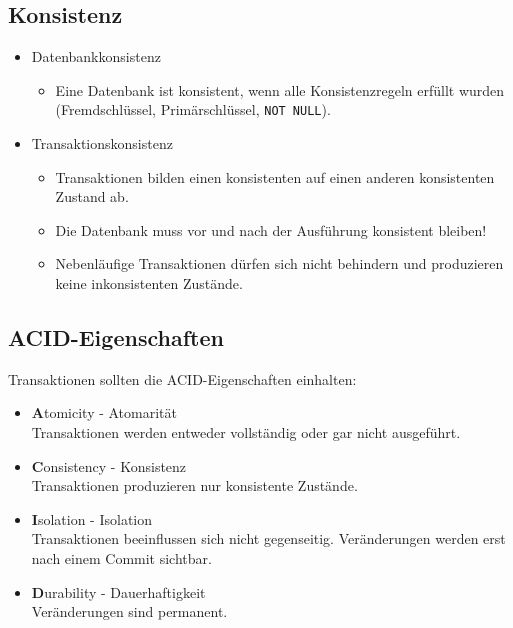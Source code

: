         \subsection{Konsistenz} %
            \begin{itemize}
            	\item Datenbankkonsistenz
            		\begin{itemize}
            			\item Eine Datenbank ist konsistent, wenn alle Konsistenzregeln erfüllt wurden (Fremdschlüssel, Primärschlüssel, \lstinline|NOT NULL|).
            		\end{itemize}
            	\item Transaktionskonsistenz
            		\begin{itemize}
            			\item Transaktionen bilden einen konsistenten auf einen anderen konsistenten Zustand ab.
            			\item Die Datenbank muss vor und nach der Ausführung konsistent bleiben!
            			\item Nebenläufige Transaktionen dürfen sich nicht behindern und produzieren keine inkonsistenten Zustände.
            		\end{itemize}
            \end{itemize}

        \subsection{ACID-Eigenschaften} %
            Transaktionen sollten die ACID-Eigenschaften einhalten:
            \begin{itemize}
            	\item \textbf{A}tomicity - Atomarität \\ Transaktionen werden entweder vollständig oder gar nicht ausgeführt.
            	\item \textbf{C}onsistency - Konsistenz \\ Transaktionen produzieren nur konsistente Zustände.
            	\item \textbf{I}solation - Isolation \\ Transaktionen beeinflussen sich nicht gegenseitig. Veränderungen werden erst nach einem Commit sichtbar.
            	\item \textbf{D}urability - Dauerhaftigkeit \\ Veränderungen sind permanent.
            \end{itemize}

